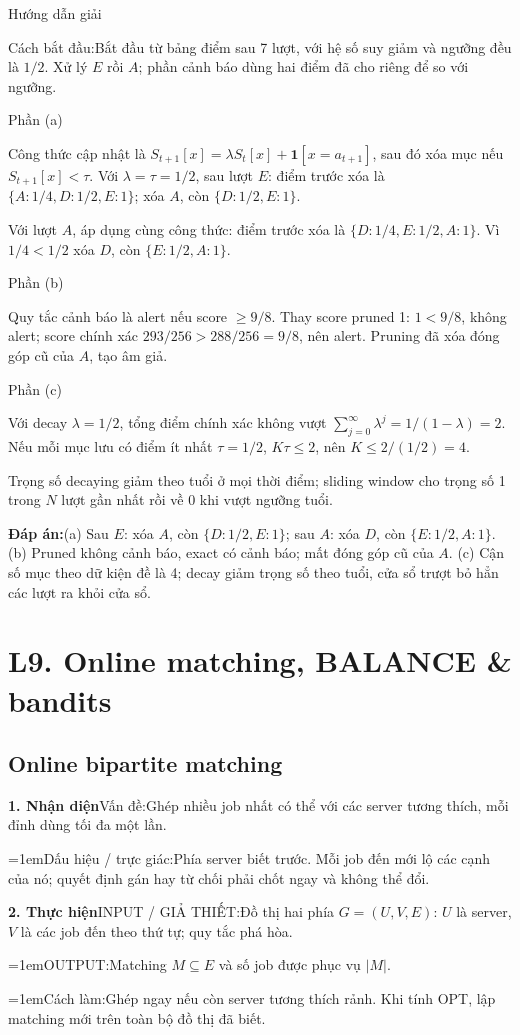 \documentclass[10pt,a4paper,twocolumn]{article}
\makeatletter
\newcommand{\maptag}[1]{\phantomsection\@bsphack\protected@write\@auxout{}{\string\newlabel{#1}{{}{\thepage}{}{\@currentHref}{}}}\@esphack}
\newcommand{\lecture}[2]{%
  \par
  \section{L#1. #2}\label{lecture:#1}}
\newif\ifexamheadingprinted
\newcommand{\topic}[2]{%
  \global\examheadingprintedfalse\par\subsection{#2}\label{topic:#1}}
\newcommand{\key}[1]{#1:\enspace}
\newcommand{\solutionprompt}[1]{\par\addvspace{1pt}\noindent\key{Cách bắt đầu}#1\par\addvspace{2pt}}
\newcommand{\blocklabel}[1]{\par\noindent#1\par\nobreak}
\newcommand{\answer}[1]{%
  \par\addvspace{3pt}%
  \blocklabel{#1Hướng dẫn giải}}
\newcommand{\finalanswer}[1]{%
  \par\addvspace{3pt}\noindent\textbf{Đáp án:}\nobreak\enspace#1\par}
\newcommand{\guidepart}[1]{%
  \par\addvspace{1.5pt}%
  \blocklabel{Phần #1}}
\newcommand{\algfield}[2]{\par\noindent\hangindent=1em\relax#1:\enspace#2}
\newcommand{\unitfield}[4]{%
  \par\noindent\textbf{#1. #2}\enspace #3:\enspace #4}
\newcommand{\algsummary}[6]{%
  \begingroup\setlength{\parskip}{1pt}%
  \unitfield{1}{Nhận diện}{Vấn đề}{#1}%
  \algfield{Dấu hiệu / trực giác}{#2}%
  \if\relax\detokenize{#3}\relax\else\par\noindent#3\par\fi%
  \unitfield{2}{Thực hiện}{INPUT / GIẢ THIẾT}{#4}%
  \algfield{OUTPUT}{#5}%
  \algfield{Cách làm}{#6}\par\endgroup}
\makeatother
\begin{document}
\answer{\maptag{answer:Pr26}}
\solutionprompt{Bắt đầu từ bảng điểm sau 7 lượt, với hệ số suy giảm và ngưỡng đều là $1/2$. Xử lý $E$ rồi $A$; phần cảnh báo dùng hai điểm đã cho riêng để so với ngưỡng.}
\guidepart{(a)}
\begin{guidesteps}
\item Công thức cập nhật là $S_{t+1}[x]=\lambda S_t[x]+\mathbf1[x=a_{t+1}]$, sau đó xóa mục nếu $S_{t+1}[x]<\tau$. Với $\lambda=\tau=1/2$, sau lượt $E$: điểm trước xóa là $\{A:1/4,D:1/2,E:1\}$; xóa $A$, còn $\{D:1/2,E:1\}$.
\item Với lượt $A$, áp dụng cùng công thức: điểm trước xóa là $\{D:1/4,E:1/2,A:1\}$. Vì $1/4<1/2$ xóa $D$, còn $\{E:1/2,A:1\}$.
\end{guidesteps}
\guidepart{(b)}
\begin{guidesteps}
\item Quy tắc cảnh báo là alert nếu score $\ge9/8$. Thay score pruned 1: $1<9/8$, không alert; score chính xác $293/256>288/256=9/8$, nên alert. Pruning đã xóa đóng góp cũ của $A$, tạo âm giả.
\end{guidesteps}
\guidepart{(c)}
\begin{guidesteps}
\item Với decay $\lambda=1/2$, tổng điểm chính xác không vượt $\sum_{j=0}^\infty\lambda^j=1/(1-\lambda)=2$. Nếu mỗi mục lưu có điểm ít nhất $\tau=1/2$, $K\tau\le2$, nên $K\le2/(1/2)=4$.
\item Trọng số decaying giảm theo tuổi ở mọi thời điểm; sliding window cho trọng số 1 trong $N$ lượt gần nhất rồi về 0 khi vượt ngưỡng tuổi.
\end{guidesteps}
\finalanswer{(a) Sau $E$: xóa $A$, còn $\{D:1/2,E:1\}$; sau $A$: xóa $D$, còn $\{E:1/2,A:1\}$. (b) Pruned không cảnh báo, exact có cảnh báo; mất đóng góp cũ của $A$. (c) Cận số mục theo dữ kiện đề là 4; decay giảm trọng số theo tuổi, cửa sổ trượt bỏ hẳn các lượt ra khỏi cửa sổ.}

\lecture{9}{Online matching, BALANCE \& bandits}
\topic{matching}{Online bipartite matching}

\algsummary{Ghép nhiều job nhất có thể với các server tương thích, mỗi đỉnh dùng tối đa một lần.}{Phía server biết trước. Mỗi job đến mới lộ các cạnh của nó; quyết định gán hay từ chối phải chốt ngay và không thể đổi.}{}{Đồ thị hai phía $G=(U,V,E)$: $U$ là server, $V$ là các job đến theo thứ tự; quy tắc phá hòa.}{Matching $M\subseteq E$ và số job được phục vụ $|M|$.}{Ghép ngay nếu còn server tương thích rảnh. Khi tính OPT, lập matching mới trên toàn bộ đồ thị đã biết.}
\end{document}
